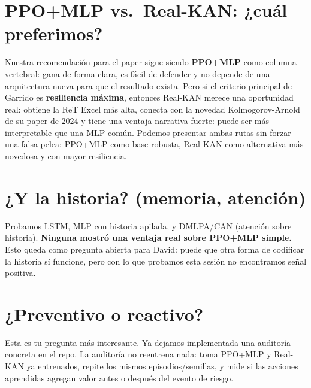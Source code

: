 \documentclass[11pt]{article}
\begin{document}
\section*{PPO+MLP vs.\ Real-KAN: ¿cuál preferimos?}

Nuestra recomendación para el paper sigue siendo \textbf{PPO+MLP} como columna vertebral: gana de
forma clara, es fácil de defender y no depende de una arquitectura nueva para que el resultado
exista. Pero si el criterio principal de Garrido es \textbf{resiliencia máxima}, entonces Real-KAN
merece una oportunidad real: obtiene la ReT Excel más alta, conecta con la novedad
Kolmogorov-Arnold de su paper de 2024 y tiene una ventaja narrativa fuerte: puede ser más
interpretable que una MLP común. Podemos presentar ambas rutas sin forzar una falsa pelea:
PPO+MLP como base robusta, Real-KAN como alternativa más novedosa y con mayor resiliencia.

\section*{¿Y la historia? (memoria, atención)}

Probamos LSTM, MLP con historia apilada, y DMLPA/CAN (atención sobre historia). \textbf{Ninguna
mostró una ventaja real sobre PPO+MLP simple.} Esto queda como pregunta abierta para David: puede
que otra forma de codificar la historia sí funcione, pero con lo que probamos esta sesión no
encontramos señal positiva.

\section*{¿Preventivo o reactivo?}

Esta es tu pregunta más interesante. Ya dejamos implementada una auditoría concreta en el repo.
La auditoría no reentrena nada: toma PPO+MLP y Real-KAN ya entrenados, repite los mismos
episodios/semillas, y mide si las acciones aprendidas agregan valor antes o después del evento de
riesgo.
\end{document}

